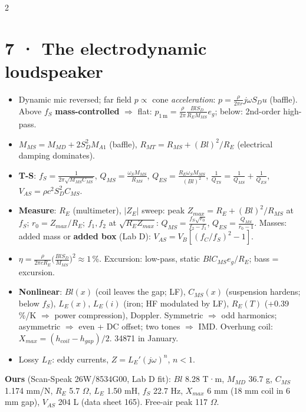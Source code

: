 \documentclass[8pt]{extarticle}
\begin{document}
\begin{multicols}{2}
\section{7 · The electrodynamic loudspeaker}
\begin{itemize}
\item Dynamic mic reversed; far field $p\propto$ cone \emph{acceleration}: $p=\frac{\rho}{2\pi r}j\omega S_D u$ (baffle). Above $f_S$ \textbf{mass-controlled} $\Rightarrow$ flat: $p_{1\,\mathrm m}=\frac{\rho}{2\pi}\frac{Bl S_D}{R_EM_{MS}}e_g$; below: 2nd-order high-pass.
\item $M_{MS}=M_{MD}+2S_D^2M_{A1}$ (baffle), $R_{MT}=R_{MS}+(Bl)^2/R_E$ (electrical damping dominates).
\item \textbf{T-S}: $f_S=\frac1{2\pi\sqrt{M_{MS}C_{MS}}}$, $Q_{MS}=\frac{\omega_SM_{MS}}{R_{MS}}$, $Q_{ES}=\frac{R_E\omega_SM_{MS}}{(Bl)^2}$, $\frac1{Q_{TS}}=\frac1{Q_{MS}}+\frac1{Q_{ES}}$, $V_{AS}=\rho c^2S_D^2C_{MS}$.
\item \textbf{Measure}: $R_E$ (multimeter), $|Z_E|$ sweep: peak $Z_{max}=R_E+(Bl)^2/R_{MS}$ at $f_S$; $r_0=Z_{max}/R_E$; $f_1,f_2$ at $\sqrt{R_EZ_{max}}$: $Q_{MS}=\frac{f_S\sqrt{r_0}}{f_2-f_1}$, $Q_{ES}=\frac{Q_{MS}}{r_0-1}$. Masses: added mass or \textbf{added box} (Lab D): $V_{AS}=V_B[(f_C/f_S)^2-1]$.
\item $\eta=\frac{\rho}{2\pi cR_E}\big(\frac{BlS_D}{M_{MS}}\big)^2\approx1$\,\%. Excursion: low-pass, static $BlC_{MS}e_g/R_E$; bass = excursion.
\item \textbf{Nonlinear}: $Bl(x)$ (coil leaves the gap; LF), $C_{MS}(x)$ (suspension hardens; below $f_S$), $L_E(x)$, $L_E(i)$ (iron; HF modulated by LF), $R_E(T)$ (+0.39 \%/K $\Rightarrow$ power compression), Doppler. Symmetric $\Rightarrow$ odd harmonics; asymmetric $\Rightarrow$ even + DC offset; two tones $\Rightarrow$ IMD. Overhung coil: $X_{max}=(h_{coil}-h_{gap})/2$. 34871 in January.
\item Lossy $L_E$: eddy currents, $Z=L_E'(j\omega)^n$, $n<1$.
\end{itemize}
\textbf{Ours} (Scan-Speak 26W/8534G00, Lab D fit): $Bl$ 8.28 T·m, $M_{MD}$ 36.7 g, $C_{MS}$ 1.174 mm/N, $R_E$ 5.7 $\Omega$, $L_E$ 1.50 mH, $f_S$ 22.7 Hz, $X_{max}$ 6 mm (18 mm coil in 6 mm gap), $V_{AS}$ 204 L (data sheet 165). Free-air peak 117 $\Omega$.


\end{multicols}
\end{document}
